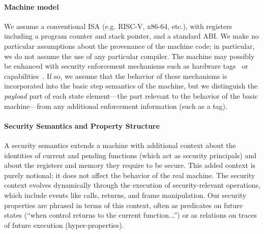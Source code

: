 \documentclass[10pt,conference]{ieeetran}%
\theoremstyle{definition}
\begin{document}

\paragraph*{Machine model}
We assume a conventional ISA (e.g. RISC-V, x86-64, etc.), with registers including a program counter
and stack pointer, and a standard ABI.
We make no particular assumptions about the provenance of the machine code; in particular,
we do not assume the use of any particular compiler.
The machine may possibly be enhanced with security
enforcement mechanisms such as hardware tags~\cite{pump_hasp2014,Gollapudi+23} or capabilities~\cite{Woodruff+14}. If so,
we assume that the behavior of these mechanisms is incorporated into the basic
step semantics of the machine, but we distinguish the \emph{payload} part of
each state element---the part relevant to the behavior of the basic machine---from
any additional enforcement information (such as a tag).

\paragraph*{Security Semantics and Property Structure}
A security semantics extends a machine
with additional context about the identities of current and pending
functions (which act as security principals) and about the registers and memory they require
to be secure. This added context is purely notional;
it does not affect the behavior of the real machine. The security context
evolves dynamically through the execution of security-relevant operations,
which include events like calls, returns, and frame manipulation.
Our security properties are phrased in terms of this context, often as predicates
on future states (``when control returns to the current function...'')
or as relations on traces of future execution
(hyper-properties).
\end{document}
